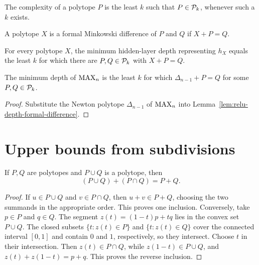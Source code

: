 \begin{definition}
  \label{def:polytope-complexity}
  The complexity of a polytope $P$ is the least $k$ such that
  $P\in\mathcal{P}_k$, whenever such a $k$ exists.
\end{definition}

\begin{definition}
  \label{def:formal-minkowski-difference}
  A polytope $X$ is a formal Minkowski difference of $P$ and $Q$ if
  $X+P=Q$.
\end{definition}

\begin{lemma}
  \label{lem:relu-depth-formal-difference}
  \notready
  For every polytope $X$, the minimum hidden-layer depth representing $h_X$
  equals the least $k$ for which there are $P,Q\in\mathcal{P}_k$ with $X+P=Q$.
\end{lemma}

\begin{corollary}
  \label{cor:max-depth-formal-difference}
  The minimum depth of $\operatorname{MAX}_n$ is the least $k$ for which
  $\Delta_{n-1}+P=Q$ for some $P,Q\in\mathcal{P}_k$.
\end{corollary}
\begin{proof}
  Substitute the Newton polytope $\Delta_{n-1}$ of $\operatorname{MAX}_n$ into
  Lemma~\ref{lem:relu-depth-formal-difference}.
\end{proof}

\section{Upper bounds from subdivisions}

\begin{lemma}
  \label{lem:two-cell-valuation}
  If $P,Q$ are polytopes and $P\cup Q$ is a polytope, then
  \[
    (P\cup Q)+(P\cap Q)=P+Q.
  \]
\end{lemma}
\begin{proof}
  If $u\in P\cup Q$ and $v\in P\cap Q$, then $u+v\in P+Q$, choosing the
  two summands in the appropriate order.  This proves one inclusion.
  Conversely, take $p\in P$ and $q\in Q$.  The segment
  $z(t)=(1-t)p+tq$ lies in the convex set $P\cup Q$.  The closed subsets
  $\{t:z(t)\in P\}$ and $\{t:z(t)\in Q\}$ cover the connected interval
  $[0,1]$ and contain $0$ and $1$, respectively, so they intersect.  Choose
  $t$ in their intersection.  Then $z(t)\in P\cap Q$, while
  $z(1-t)\in P\cup Q$, and $z(t)+z(1-t)=p+q$.  This proves the reverse
  inclusion.
\end{proof}


